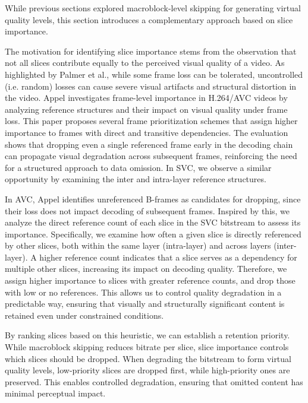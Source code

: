     While previous sections explored macroblock-level skipping for generating
    virtual quality levels, this section introduces a complementary
    approach based on slice importance.

    The motivation for identifying slice importance stems from the observation
    that not all slices contribute equally to the perceived visual quality of a
    video.  As highlighted by Palmer et al., while some frame loss can be tolerated,
    uncontrolled (i.e. random) losses can cause severe visual artifacts and
    structural distortion in the video. Appel investigates frame-level
    importance in H.264/AVC videos by analyzing reference structures and their
    impact on visual quality under frame loss. This paper proposes several frame
    prioritization schemes that assign higher importance to frames with direct
    and transitive dependencies. The evaluation shows that dropping even a
    single referenced frame early in the decoding chain can propagate visual
    degradation across subsequent frames, reinforcing the need for a structured
    approach to data omission. In SVC, we observe a similar opportunity
    by examining the inter and intra-layer reference structures.

    In AVC, Appel identifies unreferenced B-frames as candidates for dropping,
    since their loss does not impact decoding of subsequent frames. Inspired by
    this, we analyze the direct reference count of each slice in the SVC bitstream to
    assess its importance. Specifically, we examine how often a given slice is
    directly referenced by other slices, both within the same layer (intra-layer) and
    across layers (inter-layer). A higher reference count indicates that a slice
    serves as a dependency for multiple other slices, increasing its impact on
    decoding quality. Therefore, we assign higher importance to slices with
    greater reference counts, and drop those with low or no references. This
    allows us to control quality degradation in a predictable way, ensuring that
    visually and structurally significant content is retained even under
    constrained conditions.

    By ranking slices based on this heuristic, we can establish a  retention
    priority. While macroblock skipping reduces bitrate per slice, slice
    importance controls which slices should be dropped. When degrading the
    bitstream to form virtual quality levels, low-priority slices are dropped
    first, while high-priority ones are preserved. This enables controlled
    degradation, ensuring that omitted content has minimal perceptual impact.

